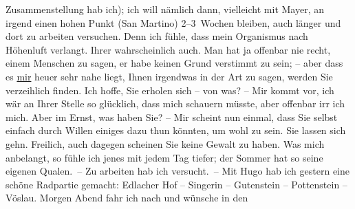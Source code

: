 \begin{ledgroupsized}[t]{13cm}
               Zusammenstellung hab ich); ich will nämlich dann, vielleicht mit Mayer, an irgend einen hohen Punkt (San Martino) 2–3 Wochen bleiben, auch länger und dort zu
               arbeiten versuchen. Denn ich fühle, dass mein Organismus nach Höhenluft verlangt.
               Ihrer wahrscheinlich auch. Man hat ja offenbar nie recht, einem Menschen zu sagen, er
               habe keinen Grund verstimmt zu sein; – aber dass es \uline{mir} heuer sehr nahe liegt, Ihnen irgendwas in der Art zu sagen, werden Sie
               verzeihlich finden. Ich hoffe, Sie erholen sich – von was? – Mir kommt vor, ich wär
               an Ihrer Stelle so glücklich, dass mich schauern müsste, aber offenbar irr ich mich.
               Aber im Ernst, was haben Sie? – Mir scheint nun einmal, dass Sie selbst einfach durch
               Willen einiges dazu thun könnten, um wohl zu sein. Sie lassen sich gehn. Freilich,
               auch dagegen scheinen Sie keine Gewalt zu haben.\pend
           \pstart
           Was mich anbelangt, so fühle ich jenes \label{K_L00928-1v}\label{K_L00928-1h} mit {\pb}jedem Tag tiefer; der Sommer
               hat so seine eigenen Qualen. – Zu arbeiten hab ich versucht. – Mit Hugo hab ich gestern eine schöne Radpartie
               gemacht: Edlacher Hof – Singerin – Gutenstein – Pottenstein – Vöslau.\pend
           \pstart
           Morgen Abend fahr ich nach \label{K_L00928-2v}\label{K_L00928-2h} und wünsche in den

\end{ledgroupsized}
